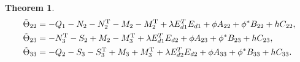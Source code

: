 \documentclass[a4paper]{cas-sc}
\newtheorem{theorem}{Theorem}
\begin{document}
\begin{theorem}
\begin{equation*}
\begin{gathered}
      {{\tilde \Theta }_{22}} =  - {Q_1} - {N_2} - N_2^{\text{T}} - {M_2} - M_2^{\text{T}} + \lambda E_{d1}^T{E_{d1}} + \phi {A_{22}} + {\phi ^*}{B_{22}} + h{C_{22}}, \hfill \\
      {{\tilde \Theta }_{23}} =  - N_3^{\text{T}} - {S_2} + {M_2} - M_3^{\text{T}} + \lambda E_{d1}^T{E_{d2}} + \phi {A_{23}} + {\phi ^*}{B_{23}} + h{C_{23}}, \hfill \\
      {{\tilde \Theta }_{33}} =  - {Q_2} - {S_3} - S_3^{\text{T}} + {M_3} + M_3^{\text{T}} + \lambda E_{d2}^T{E_{d2}} + \phi {A_{33}} + {\phi ^*}{B_{33}} + h{C_{33}}. \hfill \\
    \end{gathered}
  \end{equation*}
  \label{theorem7}
\end{theorem}
\end{document}
